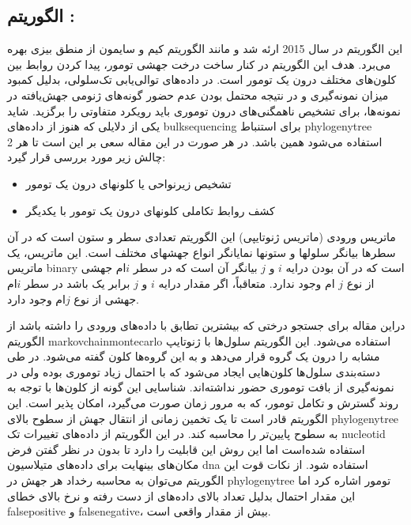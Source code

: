 \subsection{الگوریتم :\cite{yuan2015bitphylogeny}}

این الگوریتم در سال 2015 ارئه شد و مانند الگوریتم کیم و سایمون از منطق بیزی بهره می‌برد. هدف این الگوریتم در کنار ساخت درخت جهشی تومور، پیدا کردن روابط بین کلون‌های مختلف درون یک تومور است. در داده‌های توالی‌یابی تک‌سلولی، بدلیل کمبود میزان نمونه‌گیری و در نتیجه محتمل بودن عدم حضور گونه‌های ژنومی جهش‌یافته در نمونه‌ها، برای تشخیص ناهمگنی‌های درون توموری باید رویکرد متفاوتی را برگزید. شاید یکی از دلایلی که هنوز از داده‌های \gls{bulksequencing} برای استنباط \gls{phylogenytree} استفاده می‌شود همین باشد. در هر صورت در این مقاله سعی بر این است تا هر 2 چالش زیر مورد بررسی قرار گیرد: 
\begin{itemize}
	\item  تشخیص زیرنواحی یا کلونهای درون یک تومور 
	\item	کشف روابط تکاملی کلونهای درون یک تومور با یکدیگر 
\end{itemize}

ماتریس ورودی (ماتریس ژنوتایپی) این الگوریتم تعدادی سطر و ستون است که در آن سطرها بیانگر سلولها و ستونها نمایانگر انواع جهشهای مختلف است. این ماتریس، یک ماتریس \gls{binary} است که در آن بودن درایه $i$ و $j$ بیانگر آن است که در سطر $i$ام جهشی از نوع $j$ ام وجود ندارد. متعاقباً، اگر مقدار درایه $i$ و $j$ برابر یک باشد در سطر $i$ام جهشی از نوع $j$ام وجود دارد. 

دراین مقاله برای جستجو درختی که بیشترین تطابق با داده‌های ورودی را داشته باشد از الگوریتم \gls{markovchainmontecarlo} استفاده می‌شود. این الگوریتم سلول‌ها با ژنوتایپ مشابه را درون یک گروه قرار می‌دهد و به این گروه‌ها کلون گفته می‌شود. در طی دسته‌بندی سلول‌ها کلون‌هایی ایجاد می‌شود که با احتمال زیاد توموری بوده ولی در نمونه‌گیری از بافت توموری حضور نداشته‌اند. شناسایی این گونه از کلون‌ها با توجه به روند گسترش و تکامل تومور، که به مرور زمان صورت می‌گیرد، امکان پذیر است. این الگوریتم قادر است تا یک تخمین زمانی از انتقال جهش از سطوح بالای \gls{phylogenytree} به سطوح پایین‌تر را محاسبه کند. در این الگوریتم از داده‌های تغییرات تک \gls{nucleotid} استفاده شده‌است اما این روش این قابلیت را دارد تا بدون در نظر گفتن فرض مکان‌های بینهایت برای داده‌های متیلاسیون \gls{dna} استفاده شود. از نکات قوت این الگوریتم می‌توان  به محاسبه رخداد هر جهش در \gls{phylogenytree} تومور اشاره کرد اما این مقدار احتمال بدلیل تعداد بالای داده‌های از دست رفته و نرخ بالای خطای \gls{falsepositive} و \gls{falsenegative}، بیش از مقدار واقعی است. 

